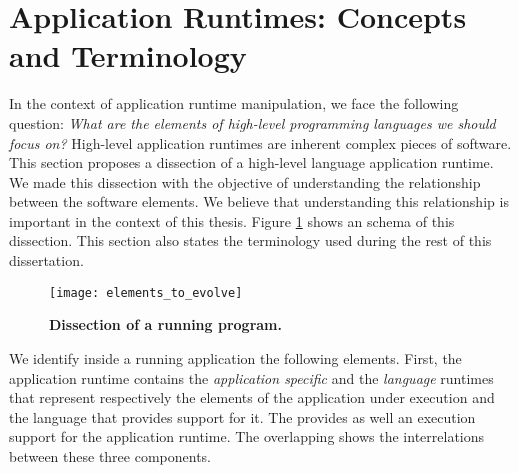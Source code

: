 


\section{Application Runtimes: Concepts and Terminology}

In the context of application runtime manipulation, we face the following question: \emph{What are the elements of high-level programming languages we should focus on?} High-level application runtimes are inherent complex pieces of software. 
This section proposes a dissection of a high-level language application runtime. We made this dissection with the objective of understanding the relationship between the software elements. We believe that understanding this relationship is important in the context of this thesis. Figure \ref{fig:whatToEvolve} shows an schema of this dissection. This section also states the terminology used during the rest of this dissertation.

\begin{figure}[!ht]
\begin{center}
\texttt{[image: elements\_to\_evolve]}
\caption{\textbf{Dissection of a running program.}\label{fig:whatToEvolve} }
\end{center}
\end{figure}

We identify inside a running application the following elements. First, the application runtime contains the \emph{application specific} and the \emph{language} runtimes that represent respectively the elements of the application under execution and the language that provides support for it. The \VM provides as well an execution support for the application runtime. The overlapping shows the interrelations between these three components.

